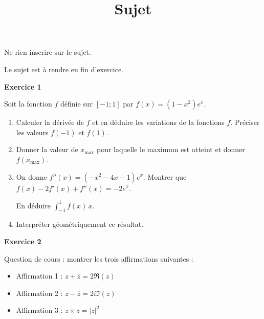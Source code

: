 \documentclass[12pt,a4paper,french]{article}
\author{}
\title{Sujet \no{16}}
\date{}
\begin{document}
\maketitle
\begin{center}Ne rien inscrire sur le sujet.

  Le sujet est à rendre en fin d'exercice.
\end{center}

\bigskip

\textbf{Exercice 1}

Soit la fonction $f$ définie sur $[-1;1]$ par $f(x) = (1-x^2)e^x$.

\begin{enumerate}
  \item Calculer la dérivée de $f$ et en déduire les variations de la
    fonctions $f$. Préciser les valeurs $f(-1)$ et $f(1)$.
  \item Donner la valeur de $x_{\max}$ pour laquelle le maximum est
    atteint et donner $f(x_{\max})$.
  \item On donne $f''(x) = \left(-x^2-4x-1\right)e^{x}$. Montrer que
    $f(x) - 2f'(x) + f''(x) = - 2e^x$.

    En déduire $\int_{-1}^1 f(x) \mathrm\,x$.
  \item Interpréter géométriquement ce résultat.
\end{enumerate}

\medskip

\textbf{Exercice 2}

Question de cours : montrer les trois affirmations suivantes :
\begin{itemize}
  \item Affirmation 1 : $z + \overline{z} = 2\Re(z)$
  \item Affirmation 2 : $z - \overline{z} = 2i\Im(z)$
  \item Affirmation 3 : $z \times \overline{z} = \lvert z \rvert^2$
\end{itemize}
\end{document}
